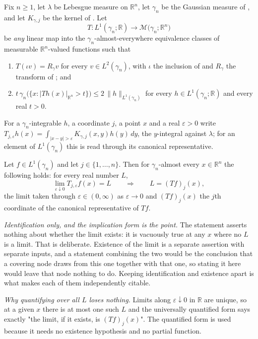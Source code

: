 \begin{lemma}
Fix $n \geq 1$, let $\lambda$ be Lebesgue measure on $\mathbb{R}^n$, let
$\gamma_n$ be the Gaussian measure of , and let
$K_{\gamma,j}$ be the kernel of .  Let
\[
  T : L^1(\gamma_n;\mathbb{R}) \longrightarrow
      \mathcal{M}\bigl(\gamma_n;\mathbb{R}^n\bigr)
\]
be \emph{any} linear map into the $\gamma_n$-almost-everywhere equivalence
classes of measurable $\mathbb{R}^n$-valued functions such that
\begin{enumerate}
\item[(T1)] $T(\iota v) = R_\gamma v$ for every $v \in L^2(\gamma_n)$, with
$\iota$ the inclusion of  and $R_\gamma$ the transform of
; and
\item[(T2)] $t\,\gamma_n\bigl(\{x : |Th(x)|_{\mathbb{R}^n} > t\}\bigr)
\leq 2\,\|h\|_{L^1(\gamma_n)}$ for every $h \in L^1(\gamma_n;\mathbb{R})$ and
every real $t > 0$.
\end{enumerate}
For a $\gamma_n$-integrable $h$, a coordinate $j$, a point $x$ and a real
$\varepsilon > 0$ write
$T_{j,\varepsilon}h(x) = \int_{|x-y|>\varepsilon}K_{\gamma,j}(x,y)h(y)\,dy$,
the $y$-integral against $\lambda$; for an element of $L^1(\gamma_n)$ this is
read through its canonical representative.

Let $f \in L^1(\gamma_n)$ and let $j \in \{1,\ldots,n\}$.  Then for
$\gamma_n$-almost every $x \in \mathbb{R}^n$ the following holds: for every
real number $L$,
\[
  \lim_{\varepsilon\downarrow0}T_{j,\varepsilon}f(x) = L
  \qquad\Longrightarrow\qquad
  L = (Tf)_j(x) ,
\]
the limit taken through $\varepsilon \in (0,\infty)$ as $\varepsilon \to 0$ and
$(Tf)_j(x)$ the $j$th coordinate of the canonical representative of $Tf$.

\emph{Identification only, and the implication form is the point.}  The
statement asserts nothing about whether the limit exists: it is vacuously true
at any $x$ where no $L$ is a limit.  That is deliberate.  Existence of the
limit is a separate assertion with separate inputs, and a statement combining
the two would be the conclusion that a covering node draws from this one
together with that one, so stating it here would leave that node nothing to do.
Keeping identification and existence apart is what makes each of them
independently citable.

\emph{Why quantifying over all $L$ loses nothing.}  Limits along
$\varepsilon \downarrow 0$ in $\mathbb{R}$ are unique, so at a given $x$ there
is at most one such $L$ and the universally quantified form says exactly "the
limit, if it exists, is $(Tf)_j(x)$".  The quantified form is used because it
needs no existence hypothesis and no partial function.


\end{lemma}
